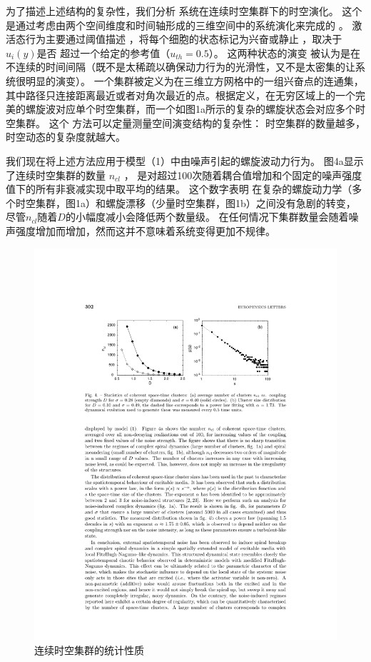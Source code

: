 \documentclass[
bachelor,
nofont, %
pdflinks,
]{xjtuthesis}
\begin{document}
\medskip
为了描述上述结构的复杂性，我们分析
系统在连续时空集群下的时空演化。 这个
是通过考虑由两个空间维度和时间轴形成的三维空间中的系统演化来完成的
。 激活态行为主要通过阈值描述
，将每个细胞的状态标记为兴奋或静⽌ ，取决于$u_i(y)$是否
超过一个给定的参考值（$u_{th}= 0.5$）。 这两种状态的演变
被认为是在不连续的时间间隔（既不是太稀疏以确保动力行为的光滑性，又不是太密集的让系统很明显的演变）。 ⼀个集群被定义为在三维⽴⽅⽹格中的⼀组兴奋点的连通集，其中路径只连接距离最近或者对角次最近的点。根据定义，在无穷区域上的一个完美的螺旋波对应单个时空集群，而一个如图1a所⽰的复杂的螺旋状态会对应多个时空集群。 这个
⽅法可以定量测量空间演变结构的复杂性：
时空集群的数量越多，时空动态的复杂度就越⼤。

\medskip
我们现在将上述⽅法应⽤于模型（1）中由噪声引起的螺旋波动力行为。 图4a显⽰了连续时空集群的数量 $n_{cl}$ ，
是对超过100次随着耦合值增加和个固定的噪声强度值下的所有⾮衰减实现中取平均的结果。 这个数字表明
在复杂的螺旋动⼒学（多个时空集群，图1a）和螺旋漂移（少量时空集群，图1b）之间没有急剧的转变，尽管$n_{cl}$随着$D$的小幅度减小会降低两个数量级。 在任何情况下集群数量会随着噪声强度增加而增加，然⽽这并不意味着系统变得更加不规律。

\begin{figure}[!ht]
\centering
\includegraphics[scale=1]{fig4.pdf}
\caption{连续时空集群的统计性质}
\end{figure}
\end{document}
